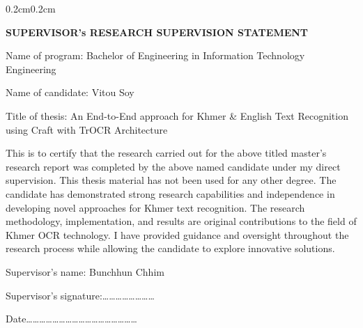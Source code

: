 
\begin{adjustwidth}{0.2cm}{0.2cm}

    \vspace{1cm}
    \begin{center}
        {\englishfont\fontsize{14pt}{21pt}\selectfont \textbf{SUPERVISOR's RESEARCH SUPERVISION STATEMENT} \par}
    \end{center}

    \vspace{-0.3cm}
    \setlength{\parindent}{0pt}
    \vspace{0.3cm}


    \label{supervisor-statement}

    \vspace{0.5cm}
    
    \englishfont\large
    \begin{flushleft}
    Name of program: Bachelor of Engineering in Information Technology Engineering\par
    Name of candidate: Vitou Soy\par
    \end{flushleft}

    \vspace{0cm}
    
    \englishfont\large
    \begin{flushleft}
    Title of thesis: An End-to-End approach for Khmer \& English Text Recognition using Craft with TrOCR Architecture\par
    \end{flushleft}

    \vspace{0.4cm}
    \setlength{\parindent}{0pt}
    This is to certify that the research carried out for the above titled master's
    research report was completed by the above named candidate under my direct
    supervision. This thesis material has not been used for any other degree. The
    candidate has demonstrated strong research capabilities and independence in
    developing novel approaches for Khmer text recognition. The research
    methodology, implementation, and results are original contributions to the field
    of Khmer OCR technology. I have provided guidance and oversight throughout
    the research process while allowing the candidate to explore innovative
    solutions.\par

    \vspace{0.6cm}
    \begin{flushleft}
    Supervisor's name: Bunchhun Chhim\par
    \vspace{0.1cm}
    Supervisor's signature:……………………\par
    \vspace{0.1cm}
    Date……………………………………………\par
    \end{flushleft}

\end{adjustwidth}